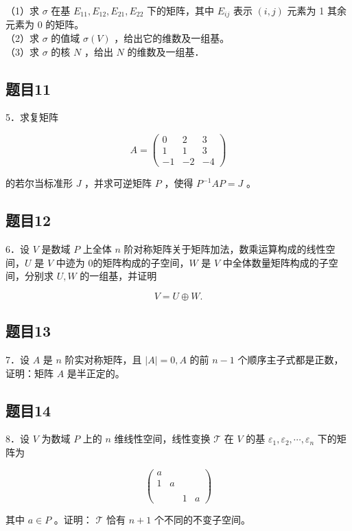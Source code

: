 \documentclass{article}
\begin{document}
（1）求 \(\sigma\) 在基 \(E_{11}, E_{12}, E_{21}, E_{22}\) 下的矩阵，其中 \(E_{i j}\) 表示 \((i, j)\) 元素为 1 其余元素为 0 的矩阵。\\
（2）求 \(\sigma\) 的值域 \(\sigma(V)\) ，给出它的维数及一组基。\\
（3）求 \(\sigma\) 的核 \(N\) ，给出 \(N\) 的维数及一组基．

\subsection{题目11}
5．求复矩阵

\[
A=\left(\begin{array}{ccc}
0 & 2 & 3 \\
1 & 1 & 3 \\
-1 & -2 & -4
\end{array}\right)
\]

的若尔当标准形 \(J\) ，并求可逆矩阵 \(P\) ，使得 \(P^{-1} A P=J\) 。

\subsection{题目12}
6．设 \(V\) 是数域 \(P\) 上全体 \(n\) 阶对称矩阵关于矩阵加法，数乘运算构成的线性空间，\(U\) 是 \(V\) 中迹为 0的矩阵构成的子空间，\(W\) 是 \(V\) 中全体数量矩阵构成的子空间，分别求 \(U, W\) 的一组基，并证明

\[
V=U \oplus W .
\]

\subsection{题目13}
7．设 \(A\) 是 \(n\) 阶实对称矩阵，且 \(|A|=0, A\) 的前 \(n-1\) 个顺序主子式都是正数，证明：矩阵 \(A\) 是半正定的。

\subsection{题目14}
8．设 \(V\) 为数域 \(P\) 上的 \(n\) 维线性空间，线性变换 \(\mathcal{T}\) 在 \(V\) 的基 \(\varepsilon_{1}, \varepsilon_{2}, \cdots, \varepsilon_{n}\) 下的矩阵为

\[
\left(\begin{array}{llll}
a & & & \\
1 & a & & \\
& & & \\
& & 1 & a
\end{array}\right)
\]

其中 \(a \in P\) 。证明： \(\mathcal{T}\) 恰有 \(n+1\) 个不同的不变子空间。
\end{document}

